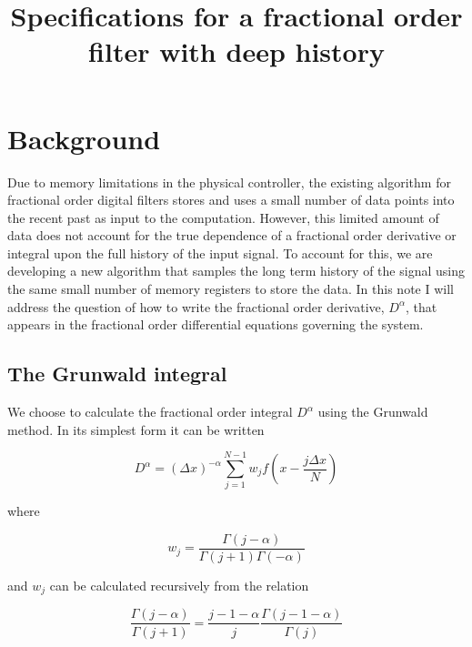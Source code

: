 \documentclass[12]{article}
\begin{document}
\title{Specifications for a fractional order filter with deep history}

\maketitle

\section{Background}

Due to memory limitations in the physical controller, the existing
algorithm for fractional order digital filters stores and uses a small
number of data points into the recent past as input to the
computation. However, this limited amount of data does not account for
the true dependence of a fractional order derivative or integral upon
the full history of the input signal. To account for this, we are
developing a new algorithm that samples the long term history of the
signal using the same small number of memory registers to store the
data. In this note I will address the question of how to write the
fractional order derivative, $D^\alpha$, that appears in the fractional order
differential equations governing the system.

\subsection{The Grunwald integral}

We choose to calculate the fractional order integral $D^\alpha$ using
the Grunwald method. In its simplest form it can be written 

\begin{equation}
D^\alpha = (\Delta x)^{-\alpha}
\displaystyle\sum\limits_{j=1}^{N-1} w_j f\left(x-\frac{j\Delta x}{N}\right)
\label{simpleGrunwald}
\end{equation}

\noindent where 

\begin{equation}
w_j = \frac{\Gamma(j-\alpha)}{\Gamma(j+1)\Gamma(-\alpha)}
\label{wj}
\end{equation}

\noindent and $w_j$ can be calculated recursively from the relation

\begin{equation}
\frac{\Gamma(j-\alpha)}{\Gamma(j+1)} = \frac{j-1-\alpha}{j}
\frac{\Gamma(j-1-\alpha)}{\Gamma(j)}
\label{gammaRecursion}
\end{equation}
\end{document}

